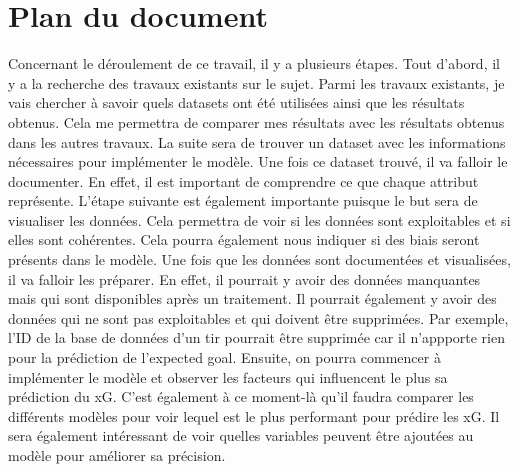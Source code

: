 \documentclass[12pt]{article}
\begin{document}
\section{Plan du document}
\noindent Concernant le déroulement de ce travail, il y a plusieurs étapes.
Tout d'abord, il y a la recherche des travaux existants sur le sujet.
Parmi les travaux existants, je vais chercher à savoir quels datasets ont été utilisées ainsi que les résultats obtenus.
Cela me permettra de comparer mes résultats avec les résultats obtenus dans les autres travaux.
\newline \newline
La suite sera de trouver un dataset avec les informations nécessaires pour implémenter le modèle.
Une fois ce dataset trouvé, il va falloir le documenter. En effet, il est important de comprendre ce que chaque attribut représente.
L'étape suivante est également importante puisque le but sera de visualiser les données.
Cela permettra de voir si les données sont exploitables et si elles sont cohérentes.
Cela pourra également nous indiquer si des biais seront présents dans le modèle.
\newline \newline
Une fois que les données sont documentées et visualisées, il va falloir les préparer.
En effet, il pourrait y avoir des données manquantes mais qui sont disponibles après un traitement.
Il pourrait également y avoir des données qui ne sont pas exploitables et qui doivent être supprimées.
Par exemple, l'ID de la base de données d'un tir pourrait être supprimée car il n'appporte rien pour la prédiction de l'expected goal.
\newline \newline
Ensuite, on pourra commencer à implémenter le modèle et observer les facteurs qui influencent le plus sa prédiction du xG.
C'est également à ce moment-là qu'il faudra comparer les différents modèles pour voir lequel est le plus performant pour prédire les xG.
Il sera également intéressant de voir quelles variables peuvent être ajoutées au modèle pour améliorer sa précision.

\newpage
\end{document}

